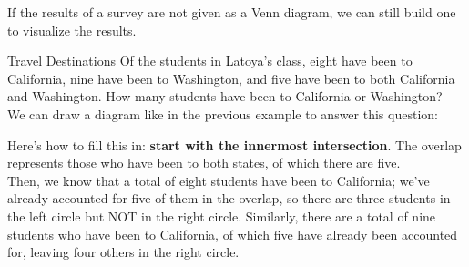 If the results of a survey are not given as a Venn diagram, we can still build one to visualize the results.

\begin{example}[https://www.youtube.com/watch?v=L02esvvq8W0]{Travel Destinations}
Of the students in Latoya's class, eight have been to California, nine have been to Washington, and five have been to both California and Washington.  How many students have been to California or Washington?\\

We can draw a diagram like in the previous example to answer this question:

\begin{center}
\end{center}

Here's how to fill this in: \textbf{start with the innermost intersection}.  The overlap represents those who have been to both states, of which there are five.\\

Then, we know that a total of eight students have been to California; we've already accounted for five of them in the overlap, so there are three students in the left circle but NOT in the right circle.  Similarly, there are a total of nine students who have been to California, of which five have already been accounted for, leaving four others in the right circle.

\begin{center}
\end{center}
\end{example}
